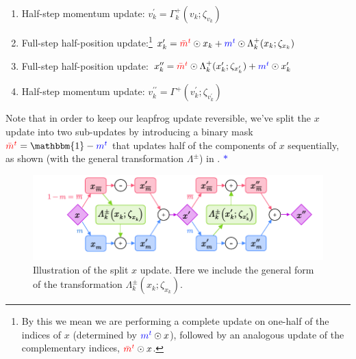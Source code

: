 \documentclass{article} %
\newcommand{\mbart}{\textcolor{red}{\bar{m}^{t}}}
\newcommand{\mt}{\textcolor{blue}{m^{t}}}
\begin{document}
\begin{enumerate}
   \item Half-step momentum update:%
      \hspace{29pt}\(%
         v^{\prime}_{k} = \Gamma^{+}_{k}(v_{k};\zeta_{v_{k}})%
   \)
   \item Full-step half-position update:\footnote{%
         By this we mean we are performing a complete update on one-half of the indices of \(x\) (determined by
         \(\mt\odot x\)), followed by an analogous update of the complementary indices, \(\mbart\odot x\).
   }
      \hspace{14pt} \(%
         x^{\prime}_{k} = \mbart\odot x_{k} + \mt\odot \Lambda^{+}_{k}(x_{k};\zeta_{x_{k}})
   \)
   \item Full-step half-position update:%
      \hspace{21pt} \(%
         x^{\prime\prime}_{k} = \mbart\odot\Lambda^{+}_{k}(x^{\prime}_{k};\zeta_{x^{\prime}_{k}}) + \mt\odot x^{\prime}_{k}
   \)
   \item Half-step momentum update:%
      \hspace{25pt} \(%
         v^{\prime\prime}_{k} = \Gamma^{+}(v^{\prime}_{k}; \zeta_{v^{\prime}_{k}})
   \)
\end{enumerate}
%
Note that in order to keep our leapfrog update reversible, we've split the \(x\) update into two sub-updates by
introducing a binary mask \(\mbart = \mathbbm{1} - \mt\) that updates half of the components of \(x\) sequentially, as
shown (with the general transformation \(\Lambda^{\pm}\)) in . \textcolor{blue}{\(\ast\)} 
\marginpar{\textcolor{blue}{\(\ast\) move splitx fig to appendix?}}
%
\begin{figure}[htpb]
   \centering
   \includegraphics[width=\textwidth]{figures/splitx10.pdf}
   \caption{\label{fig:splitx}Illustration of the split \(x\) update. Here we include the general form of the
   transformation \(\Lambda^{\pm}_{k}(x_{k};\zeta_{x_{k}})\).}
\end{figure}
%
\end{document}
